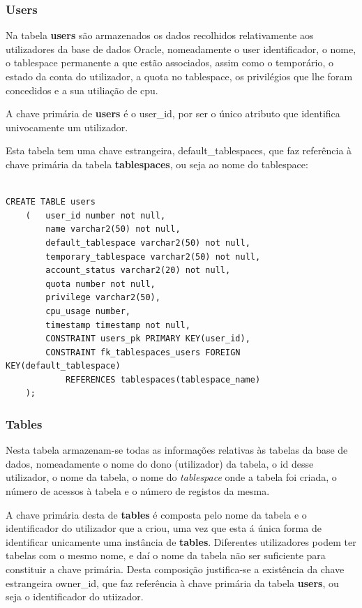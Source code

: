 \subsubsection*{Users}

Na tabela \textbf{users} são armazenados os dados recolhidos relativamente aos utilizadores da base de dados Oracle, nomeadamente o user identificador, o nome, o tablespace permanente a que estão associados, assim como o temporário, o estado da conta do utilizador, a quota no tablespace, os privilégios que lhe foram concedidos e a sua utiliação de cpu.

A chave primária de \textbf{users} é o user\_id, por ser o único atributo que identifica univocamente um utilizador.

Esta tabela tem uma chave estrangeira, default\_tablespaces, que faz referência à chave primária da tabela \textbf{tablespaces}, ou seja ao nome do tablespace:
\begin{verbatim}

CREATE TABLE users
    (   user_id number not null,
        name varchar2(50) not null,
        default_tablespace varchar2(50) not null,
        temporary_tablespace varchar2(50) not null,
        account_status varchar2(20) not null,
        quota number not null,
        privilege varchar2(50),
        cpu_usage number,
        timestamp timestamp not null,
        CONSTRAINT users_pk PRIMARY KEY(user_id),
        CONSTRAINT fk_tablespaces_users FOREIGN KEY(default_tablespace)
            REFERENCES tablespaces(tablespace_name)
    );
\end{verbatim}
\subsubsection*{Tables}

Nesta tabela armazenam-se todas as informações relativas às tabelas da base de dados, nomeadamente o nome do dono (utilizador) da tabela, o id desse utilizador, o nome da tabela, o nome do \textit{tablespace} onde a tabela foi criada, o número de acessos à tabela e o número de registos da mesma.

A chave primária desta de \textbf{tables} é composta pelo nome da tabela e o identificador do utilizador que a criou, uma vez que esta á única forma de identificar unicamente uma instância de \textbf{tables}. Diferentes utilizadores podem ter tabelas com o mesmo nome, e daí o nome da tabela não ser suficiente para constituir a chave primária. Desta composição justifica-se a existência da chave estrangeira owner\_id, que faz referência à chave primária da tabela \textbf{users}, ou seja o identificador do utiizador.




